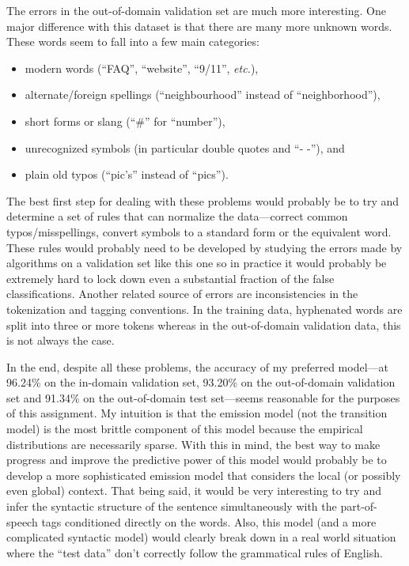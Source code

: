 \documentclass[11pt]{article}
\begin{document}
The errors in the out-of-domain validation set are much more interesting.
One major difference with this dataset is that there are many more unknown
words.
These words seem to fall into a few main categories:
\begin{itemize}
\item{modern words (``FAQ'', ``website'', ``9/11'', \emph{etc.}),}
\item{alternate/foreign spellings (``neighbourhood'' instead of
``neighborhood''),}
\item{short forms or slang (``\#'' for ``number''),}
\item{unrecognized symbols (in particular double quotes and ``- -''), and}
\item{plain old typos (``pic's'' instead of ``pics'').}
\end{itemize}
The best first step for dealing with these problems would probably be to try
and determine a set of rules that can normalize the data---correct common
typos/misspellings, convert symbols to a standard form or the equivalent word.
These rules would probably need to be developed by studying the errors made by
algorithms on a validation set like this one so in practice it would probably
be extremely hard to lock down even a substantial fraction of the false
classifications.
Another related source of errors are inconsistencies in the tokenization and
tagging conventions.
In the training data, hyphenated words are split into three or more tokens
whereas in the out-of-domain validation data, this is not always the case.

In the end, despite all these problems, the accuracy of my preferred
model---at 96.24\% on the in-domain validation set, 93.20\% on the
out-of-domain validation set and 91.34\% on the out-of-domain test set---seems
reasonable for the purposes of this assignment.
My intuition is that the emission model (not the transition model) is the most
brittle component of this model because the empirical distributions are
necessarily sparse.
With this in mind, the best way to make progress and improve the predictive
power of this model would probably be to develop a more sophisticated emission
model that considers the local (or possibly even global) context.
That being said, it would be very interesting to try and infer the syntactic
structure of the sentence simultaneously with the part-of-speech tags
conditioned directly on the words.
Also, this model (and a more complicated syntactic model) would clearly break
down in a real world situation where the ``test data'' don't correctly follow
the grammatical rules of English.
\end{document}

